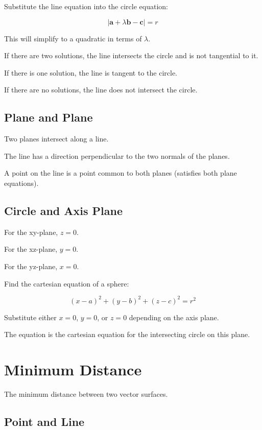 \documentclass[a4paper,11pt]{article}
\newcommand{\bb}{\boldsymbol}
\begin{document}
Substitute the line equation into the circle equation:

$$
\lvert \bb{a} + \lambda \bb{b} - \bb{c} \rvert = r
$$

This will simplify to a quadratic in terms of $\lambda$.

If there are two solutions, the line intersects the circle and is not
tangential to it.

If there is one solution, the line is tangent to the circle.

If there are no solutions, the line does not intersect the circle.


\subsection{Plane and Plane}

Two planes intersect along a line.

The line has a direction perpendicular to the two normals of the planes.

A point on the line is a point common to both planes (satisfies both plane
equations).


\subsection{Circle and Axis Plane}

For the xy-plane, $z = 0$.

For the xz-plane, $y = 0$.

For the yz-plane, $x = 0$.

Find the cartesian equation of a sphere:

$$
(x - a)^2 + (y - b)^2 + (z - c)^2 = r^2
$$

Substitute either $x = 0$, $y = 0$, or $z = 0$ depending on the axis plane.

The equation is the cartesian equation for the intersecting circle on this
plane.




\section{Minimum Distance}

The minimum distance between two vector surfaces.


\subsection{Point and Line}
\end{document}
